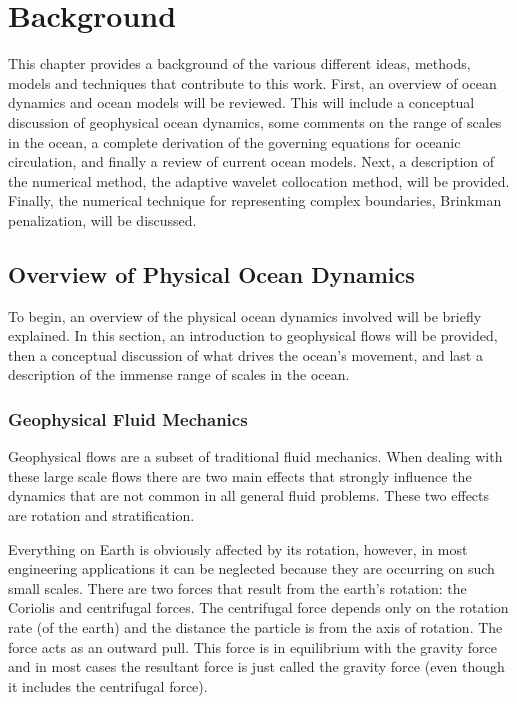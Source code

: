 \chapter{Background}
\label{chapter:2}

This chapter provides a background of the various different ideas, methods, models and techniques that contribute to this work.  First, an overview of ocean dynamics and ocean models will be reviewed.  This will include a conceptual discussion of geophysical ocean dynamics, some comments on the range of scales in the ocean, a complete derivation of the governing equations for oceanic circulation, and finally a review of current ocean models.  Next, a description of the numerical method, the adaptive wavelet collocation method, will be provided.  Finally, the numerical technique for representing complex boundaries, Brinkman penalization, will be discussed.   

\section{Overview of Physical Ocean Dynamics}

To begin, an overview of the physical ocean dynamics involved will be briefly explained.  In this section,  an introduction to geophysical flows will be provided, then a conceptual discussion of what drives the ocean's movement, and last a description of the immense range of scales in the ocean.  

\subsection{Geophysical Fluid Mechanics}

Geophysical flows are a subset of traditional fluid mechanics.  When dealing with these large scale flows there are two main effects that strongly influence the dynamics that are not common in all general fluid problems.  These two effects are rotation and stratification.

Everything on Earth is obviously affected by its rotation, however, in most engineering applications it can be neglected because they are occurring on such small scales.  There are two forces that result from the earth's rotation: the Coriolis and centrifugal forces.  The centrifugal force depends only on the rotation rate (of the earth) and the distance the particle is from the axis of rotation.  The force acts as an outward pull.  This force is in equilibrium with the gravity force and in most cases the resultant force is just called the gravity force (even though it includes the centrifugal force).

